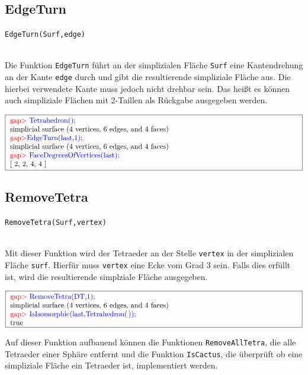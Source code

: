 \documentclass[12pt,titlepage,twoside,cleardoublepage]{article}
\theoremstyle{nummermitklammern}
\numberwithin{equation}{section}
\begin{document}
\subsection{EdgeTurn}
\begin{large}
\texttt{EdgeTurn(Surf,edge)}
\end{large}\\
Die Funktion \texttt{EdgeTurn} führt an der simplizialen Fläche \texttt{Surf} eine Kantendrehung an der Kante \texttt{edge} durch und gibt die resultierende simpliziale Fläche aus. Die hierbei verwendete Kante muss jedoch nicht drehbar sein. Das heißt es können auch simpliziale Flächen mit 2-Taillen als Rückgabe ausgegeben werden. 
\begin{center}
$\fbox{
\parbox{14cm}{
\textcolor{red}{gap$>$} \textcolor{blue}{Tetrahedron();}\newline
simplicial surface (4 vertices, 6 edges, and 4 faces)\newline
\textcolor{red}{gap$>$}\textcolor{blue}{ EdgeTurn(last,1);}\newline
simplicial surface (4 vertices, 6 edges, and 4 faces)\newline
\textcolor{red}{gap$>$} \textcolor{blue}{FaceDegreesOfVertices(last);}\newline
[ 2, 2, 4, 4 ]
}
}$
\end{center}

\subsection{RemoveTetra}
\begin{large}
\texttt{RemoveTetra(Surf,vertex)}
\end{large}\\
Mit dieser Funktion wird der Tetraeder an der Stelle \texttt{vertex} in der simplizialen Fläche \texttt{surf}. Hierfür muss \texttt{vertex} eine Ecke vom Grad 3 sein. Falls dies erfüllt ist, wird die resultierende simplziale Fläche ausgegeben. 
\begin{center}
$\fbox{
\parbox{14cm}{
\textcolor{red}{gap$>$} \textcolor{blue}{RemoveTetra(DT,1)};\newline
simplicial surface (4 vertices, 6 edges, and 4 faces)\newline
\textcolor{red}{gap$>$} \textcolor{blue}{IsIsomorphic(last,Tetrahedron(\,));}\newline
true
}
}$
\end{center}
Auf dieser Funktion aufbauend können die Funktionen \texttt{RemoveAllTetra}, die alle Tetraeder einer Sphäre entfernt und die Funktion \texttt{IsCactus}, die überprüft ob eine simpliziale Fläche ein Tetraeder ist, implementiert werden.
\end{document}
